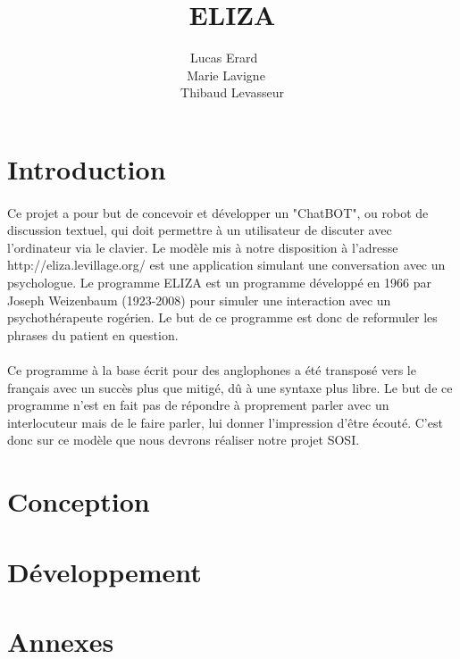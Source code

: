 \documentclass[a4paper,12pt]{article}
\title{ELIZA}
\author{Lucas Erard ~~\\ Marie Lavigne~~\\ Thibaud Levasseur}
\begin{document}
\maketitle
\newpage
\tableofcontents
\newpage
\section{Introduction}
\paragraph{}Ce projet a pour but de concevoir et développer un "ChatBOT", ou robot de discussion textuel, qui doit permettre à un utilisateur de discuter avec l'ordinateur via le clavier. Le modèle mis à notre disposition à l'adresse http://eliza.levillage.org/ est une application simulant une conversation avec un psychologue.
Le programme ELIZA est un programme développé en 1966 par Joseph Weizenbaum (1923-2008) pour simuler une interaction avec un psychothérapeute rogérien. Le but de ce programme est donc de reformuler les phrases du patient en question.
\paragraph{}Ce programme à la base écrit pour des anglophones a été transposé vers le français avec un succès plus que mitigé, dû à une syntaxe plus libre.
Le but de ce programme n'est en fait pas de répondre à proprement parler avec un interlocuteur mais de le faire parler, lui donner l'impression d'être écouté.
C'est donc sur ce modèle que nous devrons réaliser notre projet SOSI.
\section{Conception}

\section{Développement}

\section{Annexes}
\end{document}
